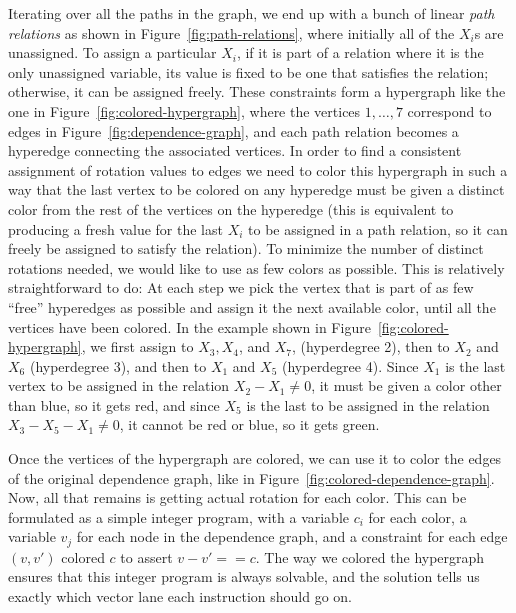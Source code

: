 Iterating over all the paths in the graph, we end up with a bunch of linear {\em path relations} as shown in Figure~\ref{fig:path-relations}, where initially all of the $X_i$s are unassigned.
To assign a particular $X_i$, if it is part of a relation where it is the only unassigned variable, its value is fixed to be one that satisfies the relation; otherwise, it can be assigned freely.
These constraints form a hypergraph like the one in Figure~\ref{fig:colored-hypergraph}, where the vertices $1,\dots, 7$ correspond to edges in Figure~\ref{fig:dependence-graph}, and each path relation becomes a hyperedge connecting the associated vertices.
In order to find a consistent assignment of rotation values to edges we need to color this hypergraph in such a way that the last vertex to be colored on any hyperedge must be given a distinct color from the rest of the vertices on the hyperedge (this is equivalent to producing a fresh value for the last $X_i$ to be assigned in a path relation, so it can freely be assigned to satisfy the relation).
To minimize the number of distinct rotations needed, we would like to use as few colors as possible.
This is relatively straightforward to do: At each step we pick the vertex that is part of as few ``free'' hyperedges as possible and assign it the next available color, until all the vertices have been colored.
In the example shown in Figure~\ref{fig:colored-hypergraph}, we first assign to $X_3, X_4$, and $X_7$, (hyperdegree 2), then to $X_2$ and $X_6$ (hyperdegree 3), and then to $X_1$ and $X_5$ (hyperdegree 4).
Since $X_1$ is the last vertex to be assigned in the relation $X_2 - X_1 \neq 0$, it must be given a color other than blue, so it gets red, and since $X_5$ is the last to be assigned in the relation $X_3 - X_5 - X_1 \neq 0$, it cannot be red or blue, so it gets green.

Once the vertices of the hypergraph are colored, we can use it to color the edges of the original dependence graph, like in Figure~\ref{fig:colored-dependence-graph}. 
Now, all that remains is getting actual rotation for each color. 
This can be formulated as a simple integer program, with a variable $c_i$ for each color, a variable  $v_j$ for each node in the dependence graph, and a constraint for each edge $(v, v')$ colored $c$ to assert $v - v' == c$.
The way we colored the hypergraph ensures that this integer program is always solvable, and the solution tells us exactly which vector lane each instruction should go on.